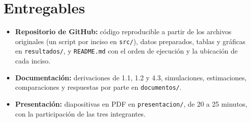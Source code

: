 \documentclass[11pt,a4paper]{article}
\begin{document}
\section*{Entregables}
\begin{itemize}
\item \textbf{Repositorio de GitHub:} código reproducible a partir de los archivos originales (un script por inciso en \texttt{src/}), datos preparados, tablas y gráficas en \texttt{resultados/}, y \texttt{README.md} con el orden de ejecución y la ubicación de cada inciso.
\item \textbf{Documentación:} derivaciones de 1.1, 1.2 y 4.3, simulaciones, estimaciones, comparaciones y respuestas por parte en \texttt{documentos/}.
\item \textbf{Presentación:} diapositivas en PDF en \texttt{presentacion/}, de 20 a 25 minutos, con la participación de las tres integrantes.
\end{itemize}
\end{document}
